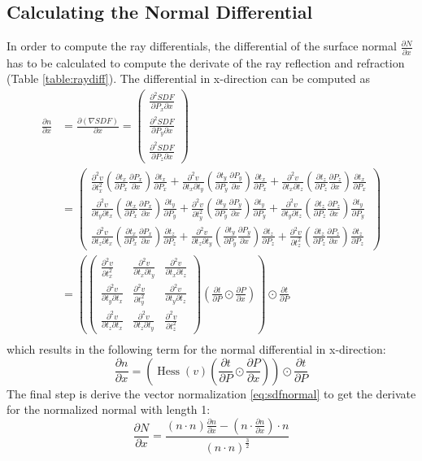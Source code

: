 \documentclass[12pt]{article}
\newcommand{\halfpow}[1]{^\frac{#1}{2}}
\newcommand{\pardiff}[2]{\frac{\partial #1}{\partial #2} }
\newcommand{\pardiffsqsame}[2]{\frac{\partial^2 #1}{\partial #2^2} }
\newcommand{\pardiffsq}[3]{\frac{\partial^2 #1}{\partial #2 \partial #3} }
\newcommand{\newlinell}{\\[0.6em]}
\DeclareMathOperator{\Hessian}{Hess}
\begin{document}
\subsection{Calculating the Normal Differential}
In order to compute the ray differentials, the differential of the surface normal $\pardiff{N}{x}$ has to be calculated to compute the derivate of the ray reflection and refraction (Table \ref{table:raydiff}). The differential in x-direction can be computed as
\begin{equation}
\begin{aligned}
\pardiff{n}{x} &= \pardiff{\left( \nabla SDF \right)}{x} =
\begin{pmatrix}
\pardiffsq{SDF}{P_x}{x} \newlinell
\pardiffsq{SDF}{P_y}{x} \newlinell
\pardiffsq{SDF}{P_z}{x}
\end{pmatrix} \newlinell
&=
\begin{pmatrix}
\pardiffsqsame{v}{t_x}  \left( \pardiff{t_x}{P_x} \pardiff{P_x}{x} \right) \pardiff{t_x}{P_x} +
\pardiffsq{v}{t_x}{t_y} \left( \pardiff{t_y}{P_y} \pardiff{P_y}{x} \right) \pardiff{t_x}{P_x} + 
\pardiffsq{v}{t_x}{t_z} \left( \pardiff{t_z}{P_z} \pardiff{P_z}{x} \right) \pardiff{t_x}{P_x}
\newlinell
\pardiffsq{v}{t_y}{t_x} \left( \pardiff{t_x}{P_x} \pardiff{P_x}{x} \right) \pardiff{t_y}{P_y} +
\pardiffsqsame{v}{t_y}  \left( \pardiff{t_y}{P_y} \pardiff{P_y}{x} \right) \pardiff{t_y}{P_y} +
\pardiffsq{v}{t_y}{t_z} \left( \pardiff{t_z}{P_z} \pardiff{P_z}{x} \right) \pardiff{t_y}{P_y}
\newlinell
\pardiffsq{v}{t_z}{t_x} \left( \pardiff{t_x}{P_x} \pardiff{P_x}{x} \right) \pardiff{t_z}{P_z} +
\pardiffsq{v}{t_z}{t_y} \left( \pardiff{t_y}{P_y} \pardiff{P_y}{x} \right) \pardiff{t_z}{P_z} +
\pardiffsqsame{v}{t_z}  \left( \pardiff{t_z}{P_z} \pardiff{P_z}{x} \right) \pardiff{t_z}{P_z}
\end{pmatrix}
\newlinell
&=
\left(
\begin{pmatrix}
\pardiffsqsame{v}{t_x} & \pardiffsq{v}{t_x}{t_y} & \pardiffsq{v}{t_x}{t_z} \newlinell
\pardiffsq{v}{t_y}{t_x} & \pardiffsqsame{v}{t_y} & \pardiffsq{v}{t_y}{t_z} \newlinell
\pardiffsq{v}{t_z}{t_x} & \pardiffsq{v}{t_z}{t_y} & \pardiffsqsame{v}{t_z}
\end{pmatrix}
\left( \pardiff{t}{P} \odot \pardiff{P}{x} \right) \right) \odot \pardiff{t}{P} \newlinell
\end{aligned}
\end{equation}
which results in the following term for the normal differential in x-direction:
\begin{equation}
\pardiff{n}{x} = \left( \Hessian(v) \left( \pardiff{t}{P} \odot \pardiff{P}{x} \right) \right) \odot \pardiff{t}{P}
\end{equation}
The final step is derive the vector normalization \eqref{eq:sdfnormal} to get the derivate for the normalized normal with length 1:
\begin{equation}
\pardiff{N}{x} = \frac{(n \cdot n) \pardiff{n}{x} - (n \cdot \pardiff{n}{x}) \cdot n}{(n \cdot n) \halfpow{3}}
\end{equation}
\end{document}
